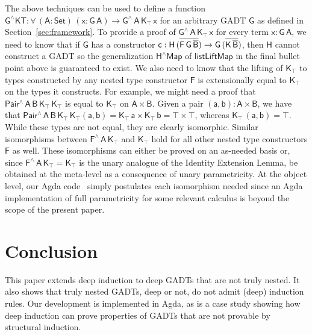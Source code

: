 \documentclass[9pt]{entcs}
\begin{document}
The above techniques can be used to define a function
$\mathsf{G^\wedge KT : \forall\, (A : Set)\, (x : G\,A) \to
  G^{\wedge}\, A\, K_\top\, x}$ for an arbitrary GADT $\mathsf{G}$ as
defined in Section~\ref{sec:framework}.  To provide a proof of
$\mathsf{G^{\wedge}\, A\, K_\top \, x}$ for every term $\mathsf{x :
  G\, A}$, we need to know that if $\mathsf{G}$ has a constructor
$\mathsf{c : H \, (\overline{F\,G\, \overline{B}}) \to G\, (\overline{K\,\overline{B}})}$,
then $\mathsf{H}$ cannot construct a GADT so the generalization
$\mathsf{H^\wedge Map}$ of $\mathsf{listLiftMap}$ in the final bullet
point above is guaranteed to exist. We also need to know that the
lifting of $\mathsf{K_\top}$ to types constructed by any nested type
constructor $\mathsf{F}$ is extensionally equal to $\mathsf{K_\top}$
on the types it constructs. For example, we might need a proof that
$\mathsf{Pair^{\wedge}\,A\,B\,K_\top\,K_\top}$ is equal to
$\mathsf{K_\top}$ on $\mathsf{A \times B}$.  Given a pair $\mathsf{(a
  , b) : A \times B}$, we have that
$\mathsf{Pair^{\wedge}\,A\,B\,K_\top\,K_\top (a, b) = K_\top \, a
  \times K_\top\, b = \top \times \top}$, whereas $\mathsf{K_\top\,
  (a, b) = \top}$. While these types are not equal, they are clearly
isomorphic. Similar isomorphisms between
$\mathsf{F^{\wedge}\,A\,K_\top}$ and $\mathsf{K_\top}$ hold for all
other nested type constructors $\mathsf{F}$ as well. These
isomorphisms can either be proved on an as-needed basis or, since
$\mathsf{F^\wedge\,A\,K_\top = K_\top}$ is the unary analogue of the
Identity Extension Lemma, be obtained at the meta-level as a
consequence of unary parametricity. At the object level, our Agda
code~\cite{web-page} simply postulates each isomorphism needed since
an Agda implementation of full parametricity for some relevant
calculus is beyond the scope of the present paper.

\section{Conclusion}\label{sec:conclusion}

This paper extends deep induction to deep GADTs that are not truly
nested. It also shows that truly nested GADTs, deep or not, do not
admit (deep) induction rules. Our development is implemented in Agda,
as is a case study showing how deep induction can prove properties of
GADTs that are not provable by structural induction.

\pagebreak
\end{document}
